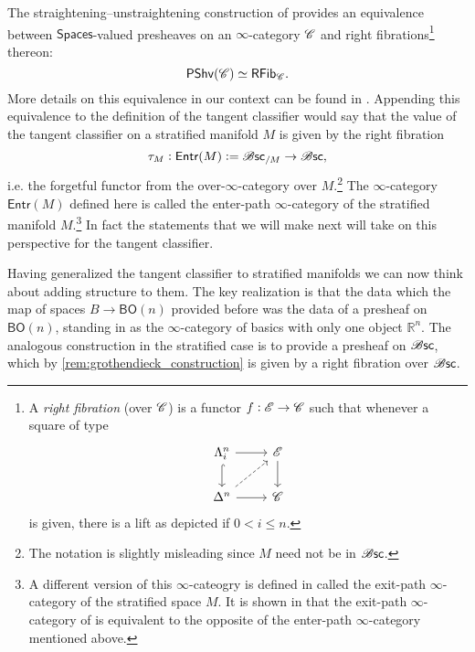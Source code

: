 \documentclass[../text]{subfiles}
\begin{document}
\begin{remark}\label{rem:grothendieck_construction}
    The straightening--unstraightening construction of \cite[§2.2]{lurie_htt} provides an equivalence between $\mathsf{Spaces}$-valued presheaves on an $\infty$-category $\mathscr{C}$ and right fibrations\footnote{A \emph{right fibration} (over $\mathscr{C}$) is a functor $f:\mathscr{E} \rightarrow \mathscr{C}$ such that whenever a square of type
    \begin{equation}
        \begin{tikzcd}[ampersand replacement=\&]
            \Lambda^n_i \arrow[r] \arrow[d, hook] \& \mathscr{E} \arrow[d] \\
            \Delta^n \arrow[r] \arrow[ru, dashed] \& \catC        
        \end{tikzcd}
    \end{equation}
    is given, there is a lift as depicted if $0 < i \leq n$.} thereon:
    \begin{equation}
        \mathsf{PShv}(\mathscr{C}) \simeq \mathsf{RFib}_{\mathscr{C}}.
    \end{equation}
    More details on this equivalence in our context can be found in \cite[§4.2]{aft_localstrut}. Appending this equivalence to the definition of the tangent classifier would say that the value of the tangent classifier on a stratified manifold $M$ is given by the right fibration
    \begin{equation}
        \tau_M: \mathsf{Entr}(M) := \mathscr{B} \mathsf{sc}_{/M} \rightarrow \mathscr{B} \mathsf{sc},
    \end{equation}
    i.e. the forgetful functor from the over-$\infty$-category over $M$.\footnote{The notation is slightly misleading since $M$ need not be in $\mathscr{B} \mathsf{sc}$.} The $\infty$-category $\mathsf{Entr}(M)$ defined here is called the enter-path $\infty$-category of the stratified manifold $M$.\footnote{A different version of this $\infty$-cateogry is defined in \cite[§A.6]{lurie_ha} called the exit-path $\infty$-category of the stratified space $M$. It is shown in \cite{afr_homhyp} that the exit-path $\infty$-category of \cite[§A.6]{lurie_ha} is equivalent to the opposite of the enter-path $\infty$-category mentioned above.} In fact the statements that we will make next will take on this perspective for the tangent classifier.
\end{remark}

Having generalized the tangent classifier to stratified manifolds we can now think about adding structure to them. The key realization is that the data which the map of spaces $B \rightarrow \mathsf{BO}(n)$ provided before was the data of a presheaf on $\mathsf{BO}(n)$, standing in as the $\infty$-category of basics with only one object $\mathbb{R}^n$. The analogous construction in the stratified case is to provide a presheaf on $\mathscr{B} \mathsf{sc}$, which by \cref{rem:grothendieck_construction} is given by a right fibration over $\mathscr{B} \mathsf{sc}$. 
\end{document}

